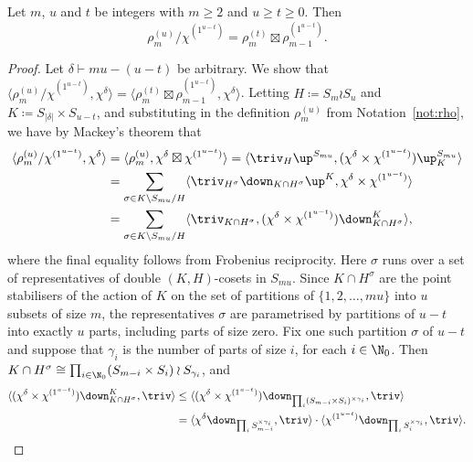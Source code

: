 \begin{lemma}\label{lem:16.6}
	Let $m$, $u$ and $t$ be integers with $m\ge 2$ and $u\ge t\ge 0$. Then
	\[ \rho^{(u)}_m/\chi^{(1^{u-t})} = \rho^{(t)}_m\boxtimes \rho^{(1^{u-t})}_{m-1}. \]
\end{lemma}

\begin{proof}
	Let $\delta\vdash mu-(u-t)$ be arbitrary. We show that $\langle \rho^{(u)}_m/\chi^{(1^{u-t})}, \chi^\delta\rangle = \langle\rho^{(t)}_m\boxtimes \rho^{(1^{u-t})}_{m-1}, \chi^\delta\rangle$. 
	Letting $H\coloneqq S_m\wr S_u$ and $K\coloneqq S_{|\delta|}\times S_{u-t}$, and substituting in the definition $\rho^{(u)}_m$ from Notation~\ref{not:rho}, we have by Mackey's theorem that
	\begin{align}\label{eqn:16.6}
		\langle \rho^{(u)}_m/\chi^{(1^{u-t})}, \chi^\delta\rangle &= \langle \rho^{(u)}_m, \chi^\delta\boxtimes\chi^{(1^{u-t})}\rangle = \langle \triv_H\up^{S_{mu}}, (\chi^\delta\times\chi^{(1^{u-t})})\up_K^{S_{mu}}\rangle \nonumber\\
		&= \sum_{\sigma\in K\setminus S_{mu}/H}\langle\triv_{H^\sigma}\down_{K\cap H^\sigma}\up^K,\chi^\delta\times\chi^{(1^{u-t})}\rangle\nonumber\\
		&=\sum_{\sigma\in K\setminus S_{mu}/H}\langle\triv_{K\cap H^\sigma},(\chi^\delta\times\chi^{(1^{u-t})})\down^K_{K\cap H^\sigma}\rangle,
	\end{align}
	where the final equality follows from Frobenius reciprocity.
	Here $\sigma$ runs over a set of representatives of double $(K,H)$-cosets in $S_{mu}$. Since $K\cap H^\sigma$ are the point stabilisers of the action of $K$ on the set of partitions of $\{1,2,\dotsc,mu\}$ into $u$ subsets of size $m$, the representatives $\sigma$ are parametrised by partitions of $u-t$ into exactly $u$ parts, including parts of size zero. 
	Fix one such partition $\sigma$ of $u-t$ and suppose that $\gamma_i$ is the number of parts of size $i$, for each $i\in\N_0$. Then $K\cap H^\sigma \cong \prod_{i\in\N_0} (S_{m-i}\times S_i)\wr S_{\gamma_i}$, and
	\begin{align*}
		\langle (\chi^\delta\times\chi^{(1^{u-t})})\down^K_{K\cap H^\sigma}, \triv\rangle &\le \langle (\chi^\delta\times\chi^{(1^{u-t})})\down_{\prod_i (S_{m-i}\times S_i)^{\times \gamma_i}}, \triv\rangle\\
		&= \langle \chi^\delta\down_{\prod_i S_{m-i}^{\times\gamma_i}},\triv\rangle\cdot \langle \chi^{(1^{u-t})}\down_{\prod_i S_i^{\times\gamma_i}},\triv\rangle.
	\end{align*}

\end{proof}
